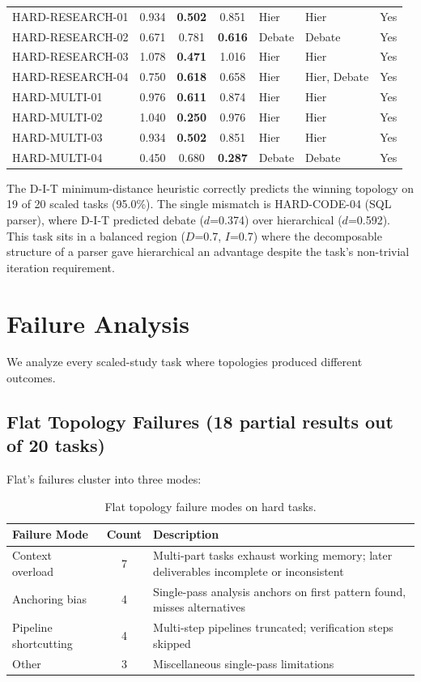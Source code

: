 \begin{table}[h]
\begin{tabular}{lccclll}
HARD-RESEARCH-01 & 0.934 & \textbf{0.502} & 0.851 & Hier & Hier & Yes \\
HARD-RESEARCH-02 & 0.671 & 0.781 & \textbf{0.616} & Debate & Debate & Yes \\
HARD-RESEARCH-03 & 1.078 & \textbf{0.471} & 1.016 & Hier & Hier & Yes \\
HARD-RESEARCH-04 & 0.750 & \textbf{0.618} & 0.658 & Hier & Hier, Debate & Yes \\
HARD-MULTI-01 & 0.976 & \textbf{0.611} & 0.874 & Hier & Hier & Yes \\
HARD-MULTI-02 & 1.040 & \textbf{0.250} & 0.976 & Hier & Hier & Yes \\
HARD-MULTI-03 & 0.934 & \textbf{0.502} & 0.851 & Hier & Hier & Yes \\
HARD-MULTI-04 & 0.450 & 0.680 & \textbf{0.287} & Debate & Debate & Yes \\
\bottomrule
\end{tabular}
\end{table}

The D-I-T minimum-distance heuristic correctly predicts the winning topology on 19 of 20 scaled tasks (95.0\%). The single mismatch is HARD-CODE-04 (SQL parser), where D-I-T predicted debate ($d$=0.374) over hierarchical ($d$=0.592). This task sits in a balanced region ($D$=0.7, $I$=0.7) where the decomposable structure of a parser gave hierarchical an advantage despite the task's non-trivial iteration requirement.

\section{Failure Analysis}
\label{app:failures}

We analyze every scaled-study task where topologies produced different outcomes.

\subsection{Flat Topology Failures (18 partial results out of 20 tasks)}

Flat's failures cluster into three modes:

\begin{table}[h]
\centering
\caption{Flat topology failure modes on hard tasks.}
\label{tab:flat_failures}
\small
\begin{tabular}{lcp{7cm}}
\toprule
\textbf{Failure Mode} & \textbf{Count} & \textbf{Description} \\
\midrule
Context overload & 7 & Multi-part tasks exhaust working memory; later deliverables incomplete or inconsistent \\
Anchoring bias & 4 & Single-pass analysis anchors on first pattern found, misses alternatives \\
Pipeline shortcutting & 4 & Multi-step pipelines truncated; verification steps skipped \\
Other & 3 & Miscellaneous single-pass limitations \\
\bottomrule
\end{tabular}
\end{table}

